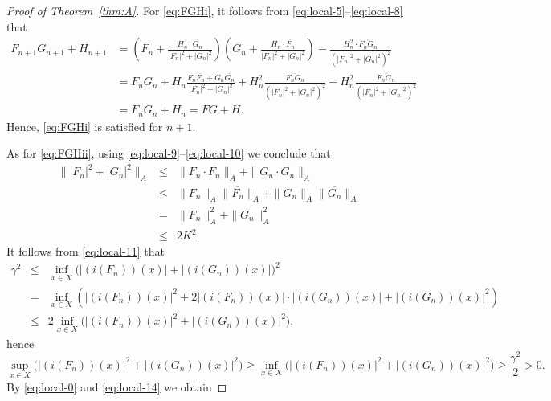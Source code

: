 \documentclass[12pt,fleqn]{amsart}
\theoremstyle{definition}
\numberwithin{equation}{section}
\theoremstyle{remark}
\begin{document}
\begin{proof}[Proof of Theorem~\ref{thm:A}]
For \eqref{eq:FGHi}, it follows from \eqref{eq:local-5}--\eqref{eq:local-8} that
%
\[
    \begin{split}
    F_{n+1}G_{n+1}+H_{n+1}
    &=
    \left(F_n+\frac{H_n\cdot\overline{G_n}}{|F_n|^2+|G_n|^2}\right)
    \left(G_n+\frac{H_n\cdot\overline{F_n}}{|F_n|^2+|G_n|^2}\right)
    -
    \frac{H_n^2\cdot\overline{F_nG_n}}{(|F_n|^2+|G_n|^2)^2}
    \\
    &= 
    F_nG_n+H_n\frac{F_n\overline{F_n}+G_n\overline{G_n}}{|F_n|^2+|G_n|^2}
    +
    H_n^2\frac{\overline{F_nG_n}}{(|F_n|^2+|G_n|^2)^2}
    -
    H_n^2\frac{\overline{F_nG_n}}{(|F_n|^2+|G_n|^2)^2}
    \\
    &= 
    F_nG_n+H_n=FG+H.
    \end{split}
\]
Hence, \eqref{eq:FGHi} is satisfied for $n+1$.

As for \eqref{eq:FGHii}, using \eqref{eq:local-9}--\eqref{eq:local-10} we conclude that
%
\begin{equation}\label{k}
    \begin{array}{lcl}
        \| |F_n|^2+|G_n|^2\|_{A}
        &\leqslant &
        \|F_n\cdot \overline{F_n}\|_{A}
        +
        \|G_n\cdot\overline{G_n}\|_{A} \\
        &\leqslant &
        \| F_n\|_{A}
        \|\overline{F_n}\|_{A}
        +
        \|G_n\|_{A}\|\overline{G_n}\|_{A}
        \\
        &= &
        \|F_n\|_{A}^2 +\|G_n\|_{A}^2\\
        &\leqslant &
        2K^2.
    \end{array}
\end{equation}\label{eq:local-13}
%
It follows from \eqref{eq:local-11} that
\[
    \begin{array}{lcl}
        \gamma^2 &
        \leqslant &
        \inf\limits_{x\in X}\big(|(i(F_n))(x)|+|(i(G_n))(x)|\big)^2\\
        & = & \inf\limits_{x\in X} ( |(i(F_n))(x)|^2+2|(i(F_n))(x)|\cdot|(i(G_n))(x)|+|(i(G_n))(x)|^2) \\
        & \leqslant &
        2\inf\limits_{x\in X}\big(|(i(F_n))(x)|^2+|(i(G_n))(x)|^2\big),
    \end{array}
\]
hence
%
\begin{equation}\label{eq:local-14}
    \sup_{x\in X}\big(|(i(F_n))(x)|^2+|(i(G_n))(x)|^2\big)\geqslant  \inf_{x\in X}\big(|(i(F_n))(x)|^2+|(i(G_n))(x)|^2\big)\geqslant \frac{\gamma^2}{2}>0.
\end{equation}
%
By \eqref{eq:local-0} and \eqref{eq:local-14}  we obtain

\end{proof}
\end{document}

